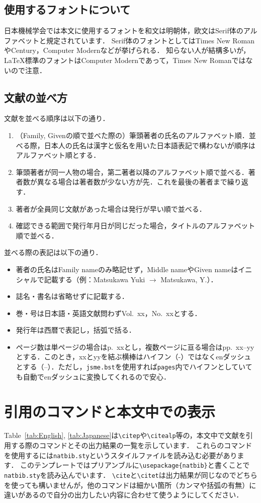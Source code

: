 \documentclass[a4paper,fleqn,12pt,uplatex]{jsarticle}
\begin{document}
\subsection{使用するフォントについて}
日本機械学会では本文に使用するフォントを和文は明朝体，欧文はSerif体のアルファベットと規定されています．
Serif体のフォントとしてはTimes New RomanやCentury，Computer Modernなどが挙げられる．
知らない人が結構多いが，\LaTeX{}標準のフォントはComputer Modernであって，Times New Romanではないので注意．

\subsection{文献の並べ方}
文献を並べる順序は以下の通り．
\begin{enumerate}
    \item （Family, Givenの順で並べた際の）筆頭著者の氏名のアルファベット順．並べる際，日本人の氏名は漢字と仮名を用いた日本語表記で構わないが順序はアルファベット順とする．
    \item 筆頭著者が同一人物の場合，第二著者以降のアルファベット順で並べる．著者数が異なる場合は著者数が少ない方が先．これを最後の著者まで繰り返す．
    \item 著者が全員同じ文献があった場合は発行が早い順で並べる．
    \item 確認できる範囲で発行年月日が同じだった場合，タイトルのアルファベット順で並べる．
\end{enumerate}

並べる際の表記は以下の通り．
\begin{itemize}
    \item 著者の氏名はFamily nameのみ略記せず，Middle nameやGiven nameはイニシャルで記載する（例：Matsukawa Yuki $\to$ Matsukawa, Y.）．
    \item 誌名・書名は省略せずに記載する．
    \item 巻・号は日本語・英語文献問わずVol.~xx，No.~xxとする．
    \item 発行年は西暦で表記し，括弧で括る．
    \item ページ数は単ページの場合はp.~xxとし，複数ページに亘る場合はpp.~xx--yyとする．このとき，xxとyyを結ぶ横棒はハイフン（-）ではなくenダッシュとする（--）．ただし，\verb|jsme.bst|を使用すれば\verb|pages|内でハイフンとしていても自動でenダッシュに変換してくれるので安心．
\end{itemize}


\section{引用のコマンドと本文中での表示}
\label{sec:cite}
Table~\ref{tab:English}, \ref{tab:Japanese}は\verb|\citep|や\verb|\citealp|等の，本文中で文献を引用する際のコマンドとその出力結果の一覧を示しています．
これらのコマンドを使用するには\verb|natbib.sty|というスタイルファイルを読み込む必要があります．
このテンプレートではプリアンブルに\verb|\usepackage{natbib}|と書くことで\verb|natbib.sty|を読み込んでいます．
\verb|\cite|と\verb|\citet|は出力結果が同じなのでどちらを使っても構いませんが，他のコマンドは細かい箇所（カンマや括弧の有無）に違いがあるので自分の出力したい内容に合わせて使うようにしてください．
\end{document}

